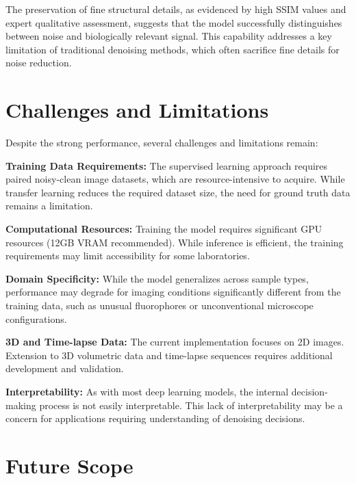 \documentclass[12pt,a4paper]{report}
\begin{document}
The preservation of fine structural details, as evidenced by high SSIM values and expert qualitative assessment, suggests that the model successfully distinguishes between noise and biologically relevant signal. This capability addresses a key limitation of traditional denoising methods, which often sacrifice fine details for noise reduction.

\section{Challenges and Limitations}

Despite the strong performance, several challenges and limitations remain:

\vspace{0.5cm}

\textbf{Training Data Requirements:} The supervised learning approach requires paired noisy-clean image datasets, which are resource-intensive to acquire. While transfer learning reduces the required dataset size, the need for ground truth data remains a limitation.

\vspace{0.5cm}

\textbf{Computational Resources:} Training the model requires significant GPU resources (12GB VRAM recommended). While inference is efficient, the training requirements may limit accessibility for some laboratories.

\vspace{0.5cm}

\textbf{Domain Specificity:} While the model generalizes across sample types, performance may degrade for imaging conditions significantly different from the training data, such as unusual fluorophores or unconventional microscope configurations.

\vspace{0.5cm}

\textbf{3D and Time-lapse Data:} The current implementation focuses on 2D images. Extension to 3D volumetric data and time-lapse sequences requires additional development and validation.

\vspace{0.5cm}

\textbf{Interpretability:} As with most deep learning models, the internal decision-making process is not easily interpretable. This lack of interpretability may be a concern for applications requiring understanding of denoising decisions.

\section{Future Scope}
\end{document}
